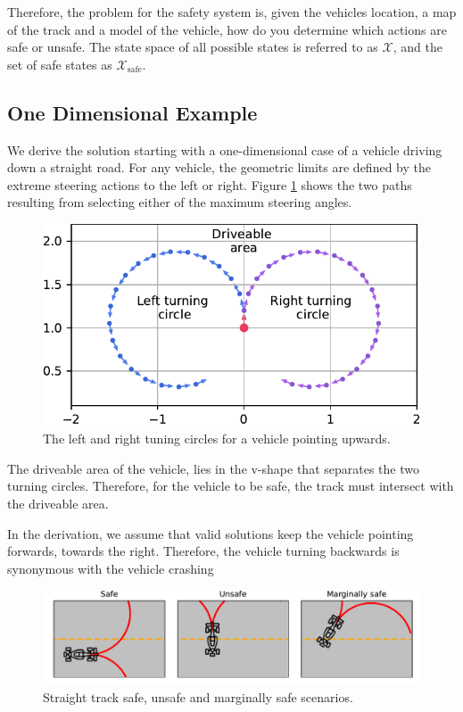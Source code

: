 \documentclass[letterpaper, 10 pt, conference]{ieeeconf}  %
\begin{document}
Therefore, the problem for the safety system is, given the vehicles location, a map of the track and a model of the vehicle, how do you determine which actions are safe or unsafe.
The state space of all possible states is referred to as $\mathcal{X}$, and the set of safe states as $\mathcal{X}_\text{safe}$.



\subsection{One Dimensional Example}

We derive the solution starting with a one-dimensional case of a vehicle driving down a straight road.
For any vehicle, the geometric limits are defined by the extreme steering actions to the left or right.
Figure \ref{fig:tuning_angle} shows the two paths resulting from selecting either of the maximum steering angles.

\begin{figure}[h]
    \centering
    \includegraphics[width=0.9\linewidth]{Imgs/tuning_angle.pdf}
    \caption{The left and right tuning circles for a vehicle pointing upwards.}
    \label{fig:tuning_angle}
\end{figure}

The driveable area of the vehicle, lies in the v-shape that separates the two turning circles.
Therefore, for the vehicle to be safe, the track must intersect with the driveable area.

In the derivation, we assume that valid solutions keep the vehicle pointing forwards, towards the right.
Therefore, the vehicle turning backwards is synonymous with the vehicle crashing

\begin{figure}[h]
    \centering
    \includegraphics[width=\linewidth]{Imgs/straight_line_safety.pdf}
    \caption{Straight track safe, unsafe and marginally safe scenarios.}
    \label{fig:straight_line_safety}
\end{figure}
\end{document}
